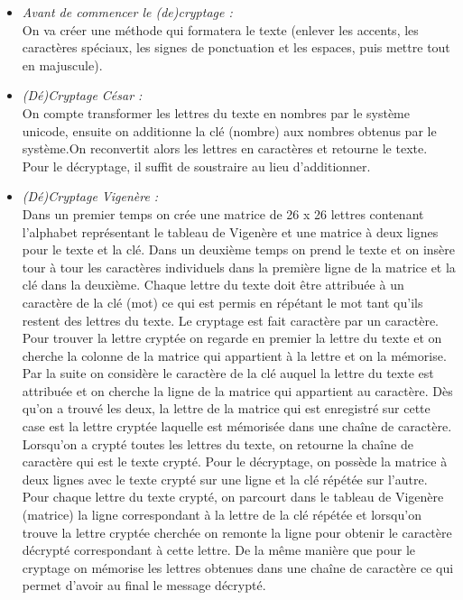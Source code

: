 \documentclass[a4paper,12pt,abstracton,titlepage]{scrartcl}
\begin{document}
\begin{itemize}
\item \textit{Avant de commencer le (de)cryptage :}\\
On va créer une méthode qui formatera le texte (enlever les accents, les caractères spéciaux, les signes de ponctuation et les espaces, puis mettre tout en majuscule).\\
\item \textit{(Dé)Cryptage César :}\\
On compte transformer les lettres du texte en nombres par le système unicode, ensuite on additionne la clé (nombre) aux nombres obtenus par le système.On reconvertit alors les lettres en caractères et retourne le texte.
Pour le décryptage, il suffit de soustraire au lieu d'additionner.\\
\item \textit{(Dé)Cryptage Vigenère :}\\
Dans un premier temps on crée une matrice de 26 x 26 lettres contenant l’alphabet représentant le tableau de Vigenère et une matrice à deux lignes pour le texte et la clé. Dans un deuxième temps on prend le texte et on insère tour à tour les caractères individuels dans la première ligne de la matrice et la clé dans la deuxième. Chaque lettre du texte doit être attribuée à un caractère de la clé (mot) ce qui est permis en répétant le mot tant qu’ils restent des lettres du texte.
Le cryptage est fait caractère par un caractère. Pour trouver la lettre cryptée on regarde en premier la lettre du texte et on cherche la colonne de la matrice qui appartient à la lettre et on la mémorise. Par la suite on considère le caractère de la clé auquel la lettre du texte est attribuée et on cherche la ligne de la matrice qui appartient au caractère. Dès qu’on a trouvé les deux, la lettre de la matrice qui est enregistré sur cette case est la lettre cryptée laquelle est mémorisée dans une chaîne de caractère. Lorsqu’on a crypté toutes les lettres du texte, on retourne la chaîne de caractère qui est le texte crypté.
Pour le décryptage, on possède la matrice à deux lignes avec le texte crypté sur une ligne et la clé répétée sur l’autre. Pour chaque lettre du texte crypté, on parcourt dans le tableau de Vigenère (matrice) la ligne correspondant à la lettre de la clé répétée et lorsqu’on  trouve la lettre cryptée cherchée on remonte la ligne pour obtenir le caractère décrypté correspondant à cette lettre. De la même manière que pour le cryptage on mémorise les lettres obtenues dans une chaîne de caractère ce qui permet d’avoir au final le message décrypté.\\

\end{itemize}
\end{document}
